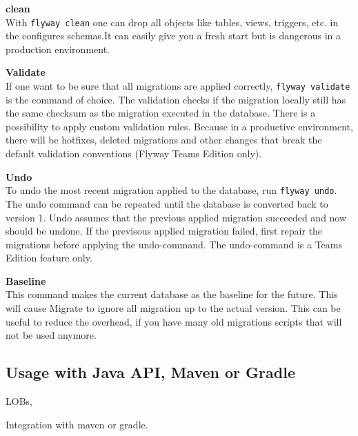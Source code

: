 \textbf{clean}\\
With \texttt{flyway clean} one can drop all objects like tables, views, triggers, etc. in the configures schemas.It can easily give you a fresh start but is dangerous in a production environment.

\textbf{Validate}\\
If one want to be sure that all migrations are applied correctly,  \texttt{flyway validate} is the command of choice. The validation checks if the migration locally still has the same checksum as the migration executed in the database.
There is a possibility to apply custom validation rules. Because in a productive environment, there will be hotfixes, deleted migrations and other changes that break the default validation conventions (Flyway Teams Edition only).


\textbf{Undo}\\
To undo the most recent migration applied to the database, run \texttt{flyway undo}. The undo command can be repeated until the database is converted back to version 1.
Undo assumes that the previous applied migration succeeded and now should be undone. If the previsous applied migration failed, first repair the migrations before applying the undo-command. 
The undo-command is a Teams Edition feature only.

\textbf{Baseline}\\
This command makes the current database as the baseline for the future. This will cause Migrate to ignore all migration up to the actual version.
This can be useful to reduce the overhead, if you have many old migrations scripts that will not be used anymore.


\subsection{Usage with Java API, Maven or Gradle}
%
LOBs,

%
Integration with maven or gradle.
\newpage